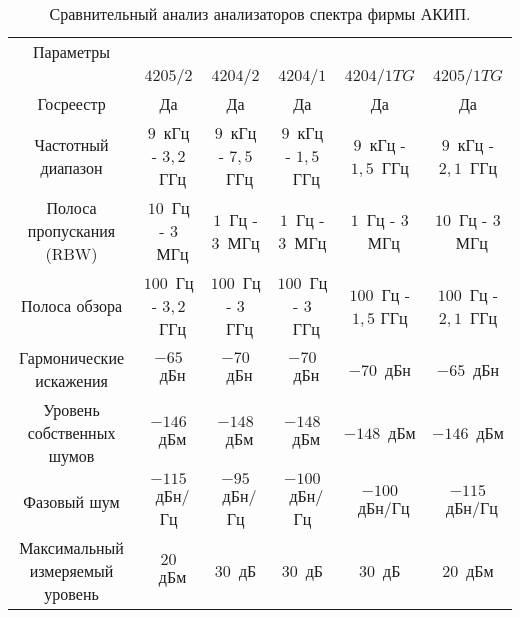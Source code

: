 \begin{table} [p]%
	\caption{Сравнительный анализ анализаторов спектра фирмы АКИП.}%
	\label{tbl:test7}%
	\begin{SingleSpace}
		\setlength\extrarowheight{6pt} %
		\setlength{\tymin}{1.7cm}%
		\begin{tabulary}{\textwidth}{@{}>{\zz}C >{\zz}C >{\zz}C >{\zz}C >{\zz}C >{\zz}C @{}}%
			\toprule     %
			Параметры &   \\
			
			&
			$4205/2$ &
			$4204/2$ &
			$4204/1$ &
			$4204/1 TG$ &
			$4205/1 TG$ \\
			
			\midrule %
			
			Госреестр &
			Да &
			Да &
			Да &
			Да &
			Да \\
			
			Частотный диапазон &
			$9$~кГц - $3,2$~ГГц & 
			$9$~кГц - $7,5$~ГГц &
			$9$~кГц - $1,5$~ГГц &
			$9$~кГц - $1,5$~ГГц &
			$9$~кГц - $2,1$~ГГц \\
			
			Полоса пропускания (RBW) &
			$10$~Гц - $3$~МГц &
			$1$~Гц - $3$~МГц &
			$1$~Гц - $3$~МГц &
			$1$~Гц - $3$~МГц &
			$10$~Гц - $3$~МГц \\
			
			Полоса обзора &	
			$100$~Гц - $3,2$~ГГц &
			$100$~Гц - $3$~ГГц &
			$100$~Гц - $3$~ГГц &
			$100$~Гц - $1,5$ ГГц &
			$100$~Гц - $2,1$~ГГц \\
			
			Гармонические искажения &
			$-65$~дБн &
			$-70$~дБн &
			$-70$~дБн &
			$-70$~дБн &
			$-65$~дБн \\
			
			Уровень собственных шумов &
			$-146$~дБм &
			$-148$~дБм &
			$-148$~дБм &
			$-148$~дБм &
			$-146$~дБм \\
			
			Фазовый шум   &
			$-115$~дБн/Гц &
			$-95$~дБн/Гц  &
			$-100$~дБн/Гц &
			$-100$~дБн/Гц &
			$-115$~дБн/Гц \\
			
			Максимальный измеряемый уровень &	
			$20$~дБм &
			$30$~дБ  &
			$30$~дБ  &
			$30$~дБ  &
			$20$~дБм \\
			
			\bottomrule %
		\end{tabulary}%
	\end{SingleSpace}
\end{table}

